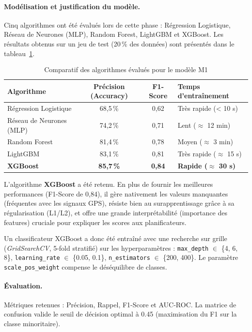 \paragraph{Modélisation et justification du modèle.}
Cinq algorithmes ont été évalués lors de cette phase : Régression Logistique, Réseau de Neurones (MLP), Random Forest, LightGBM et XGBoost. Les résultats obtenus sur un jeu de test (20\,\% des données) sont présentés dans le tableau~\ref{tab:m1-evaluation}.

\begin{table}[H]
\centering
\setlength{\arrayrulewidth}{1pt}
\begin{tabular}{|l|c|c|p{4cm}|}
\hline
\rowcolor{headerbg}
\textbf{Algorithme} & \textbf{Précision (Accuracy)} & \textbf{F1-Score} & \textbf{Temps d'entraînement} \\
\hline
Régression Logistique & 68,5\,\% & 0,62 & Très rapide (< 10 s) \\
\hline
Réseau de Neurones (MLP) & 74,2\,\% & 0,71 & Lent ($\approx$ 12 min) \\
\hline
Random Forest & 81,4\,\% & 0,78 & Moyen ($\approx$ 3 min) \\
\hline
LightGBM & 83,1\,\% & 0,81 & Très rapide ($\approx$ 15 s) \\
\hline
\textbf{XGBoost} & \textbf{85,7\,\%} & \textbf{0,84} & \textbf{Rapide ($\approx$ 30 s)} \\
\hline
\end{tabular}
\caption{Comparatif des algorithmes évalués pour le modèle M1}
\label{tab:m1-evaluation}
\end{table}
\setlength{\arrayrulewidth}{0.4pt}

L'algorithme \textbf{XGBoost} a été retenu. En plus de fournir les meilleures performances (F1-Score de 0,84), il gère nativement les valeurs manquantes (fréquentes avec les signaux GPS), résiste bien au surapprentissage grâce à sa régularisation (L1/L2), et offre une grande interprétabilité (importance des features) cruciale pour expliquer les scores aux planificateurs.

Un classificateur XGBoost a donc été entraîné avec une recherche sur grille (\textit{GridSearchCV}, 5-fold stratifié) sur les hyperparamètres : \texttt{max\_depth} $\in$ \{4, 6, 8\}, \texttt{learning\_rate} $\in$ \{0.05, 0.1\}, \texttt{n\_estimators} $\in$ \{200, 400\}. Le paramètre \texttt{scale\_pos\_weight} compense le déséquilibre de classes.

\paragraph{Évaluation.}
Métriques retenues : Précision, Rappel, F1-Score et AUC-ROC. La matrice de confusion valide le seuil de décision optimal à 0.45 (maximisation du F1 sur la classe minoritaire).

